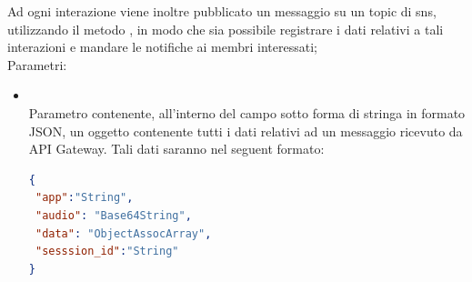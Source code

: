 \begin{itemize}
\begin{itemize}
Ad ogni interazione viene inoltre pubblicato un messaggio su un topic di sns, utilizzando il metodo , in modo che sia possibile registrare i dati relativi a tali interazioni e mandare le notifiche ai membri interessati;\\
		Parametri:
		\begin{itemize}
			\item {} \\
			Parametro contenente, all'interno del campo  sotto forma di stringa in formato JSON, un oggetto contenente tutti i dati relativi ad un messaggio ricevuto da API Gateway. Tali dati saranno nel seguent formato:
\begin{lstlisting}[language=json,firstnumber=1]
{
 "app":"String",
 "audio": "Base64String",
 "data": "ObjectAssocArray",
 "sesssion_id":"String"
}
\end{lstlisting}


\end{itemize}
\end{itemize}
\end{itemize}

